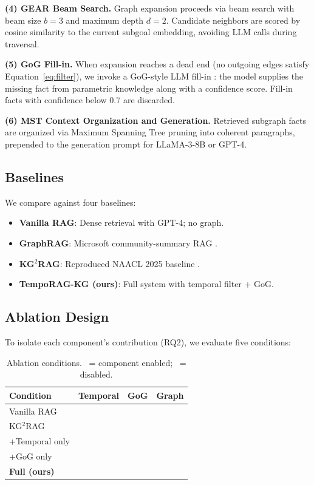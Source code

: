 \documentclass[11pt]{article}
\newcommand{\cmark}{\ding{51}}
\newcommand{\xmark}{\ding{55}}
\begin{document}
\textbf{(4) GEAR Beam Search.}
Graph expansion proceeds via beam search \cite{ma2025gear} with beam
size $b=3$ and maximum depth $d=2$. Candidate neighbors are scored by
cosine similarity to the current subgoal embedding, avoiding LLM calls
during traversal.

\textbf{(5) GoG Fill-in.}
When expansion reaches a dead end (no outgoing edges satisfy
Equation~\ref{eq:filter}), we invoke a GoG-style LLM fill-in
\cite{he2024gog}: the model supplies the missing fact from parametric
knowledge along with a confidence score. Fill-in facts with confidence
below 0.7 are discarded.

\textbf{(6) MST Context Organization and Generation.}
Retrieved subgraph facts are organized via Maximum Spanning Tree pruning
into coherent paragraphs, prepended to the generation prompt for
LLaMA-3-8B or GPT-4.

\subsection{Baselines}

We compare against four baselines:
\begin{itemize}
  \item \textbf{Vanilla RAG}: Dense retrieval with GPT-4; no graph.
  \item \textbf{GraphRAG}: Microsoft community-summary RAG \cite{edge2024graphrag}.
  \item \textbf{KG$^2$RAG}: Reproduced NAACL 2025 baseline \cite{zhu2025kg2rag}.
  \item \textbf{TempoRAG-KG (ours)}: Full system with temporal filter + GoG.
\end{itemize}

\subsection{Ablation Design}

To isolate each component's contribution (RQ2), we evaluate five conditions:

\begin{table}[t]
  \centering
  \small
  \begin{tabular}{lccc}
    \toprule
    \textbf{Condition} & \textbf{Temporal} & \textbf{GoG} & \textbf{Graph} \\
    \midrule
    Vanilla RAG            & \xmark & \xmark & \xmark \\
    KG$^2$RAG              & \xmark & \xmark & \cmark \\
    +Temporal only         & \cmark & \xmark & \cmark \\
    +GoG only              & \xmark & \cmark & \cmark \\
    \textbf{Full (ours)}   & \cmark & \cmark & \cmark \\
    \bottomrule
  \end{tabular}
  \caption{Ablation conditions. \cmark\ = component enabled;
  \xmark\ = disabled.}
  \label{tab:ablation}
\end{table}
\end{document}
